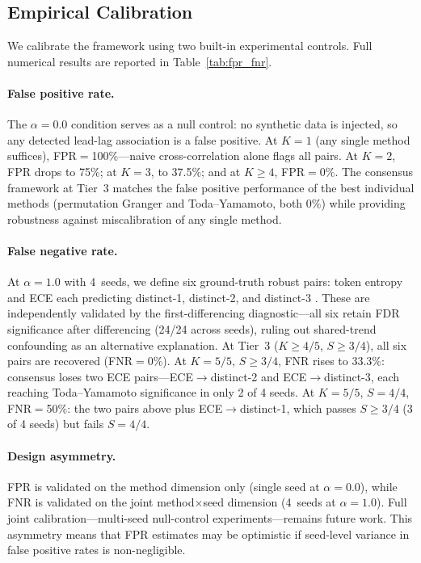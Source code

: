 \subsection{Empirical Calibration}
\label{sec:calibration}

We calibrate the framework using two built-in experimental controls.
Full numerical results are reported in Table~\ref{tab:fpr_fnr}.

\paragraph{False positive rate.}
The $\alpha{=}0.0$ condition serves as a null control: no synthetic data is injected, so any detected lead-lag association is a false positive.
At $K{=}1$ (any single method suffices), FPR${=}$100\%---naive cross-correlation alone flags all pairs.
At $K{=}2$, FPR drops to 75\%; at $K{=}3$, to 37.5\%; and at $K{\geq}4$, FPR${=}$0\%.
The consensus framework at Tier~3 matches the false positive performance of the best individual methods (permutation Granger and Toda--Yamamoto, both 0\%) while providing robustness against miscalibration of any single method.

\paragraph{False negative rate.}
At $\alpha{=}1.0$ with 4~seeds, we define six ground-truth robust pairs: token entropy and ECE each predicting distinct-1, distinct-2, and distinct-3 \cite{li2016diversity}.
These are independently validated by the first-differencing diagnostic---all six retain FDR significance after differencing (24/24 across seeds), ruling out shared-trend confounding as an alternative explanation.
At Tier~3 ($K{\geq}4/5$, $S{\geq}3/4$), all six pairs are recovered (FNR${=}$0\%).
At $K{=}5/5$, $S{\geq}3/4$, FNR rises to 33.3\%: consensus loses two ECE pairs---ECE$\to$distinct-2 and ECE$\to$distinct-3, each reaching Toda--Yamamoto significance in only 2 of 4 seeds.
At $K{=}5/5$, $S{=}4/4$, FNR${=}$50\%: the two pairs above plus ECE$\to$distinct-1, which passes $S{\geq}3/4$ (3 of 4 seeds) but fails $S{=}4/4$.

\paragraph{Design asymmetry.}
FPR is validated on the method dimension only (single seed at $\alpha{=}0.0$), while FNR is validated on the joint method${\times}$seed dimension (4~seeds at $\alpha{=}1.0$).
Full joint calibration---multi-seed null-control experiments---remains future work.
This asymmetry means that FPR estimates may be optimistic if seed-level variance in false positive rates is non-negligible.

